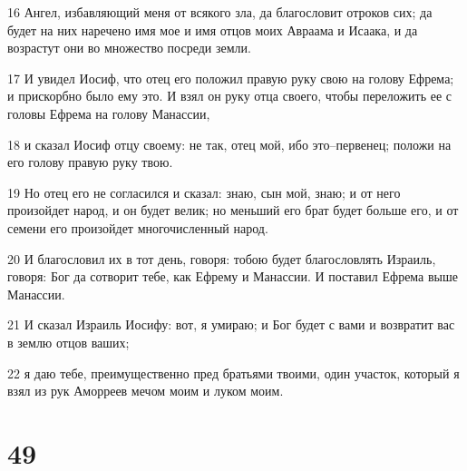 \par 16 Ангел, избавляющий меня от всякого зла, да благословит отроков сих; да будет на них наречено имя мое и имя отцов моих Авраама и Исаака, и да возрастут они во множество посреди земли.
\par 17 И увидел Иосиф, что отец его положил правую руку свою на голову Ефрема; и прискорбно было ему это. И взял он руку отца своего, чтобы переложить ее с головы Ефрема на голову Манассии,
\par 18 и сказал Иосиф отцу своему: не так, отец мой, ибо это--первенец; положи на его голову правую руку твою.
\par 19 Но отец его не согласился и сказал: знаю, сын мой, знаю; и от него произойдет народ, и он будет велик; но меньший его брат будет больше его, и от семени его произойдет многочисленный народ.
\par 20 И благословил их в тот день, говоря: тобою будет благословлять Израиль, говоря: Бог да сотворит тебе, как Ефрему и Манассии. И поставил Ефрема выше Манассии.
\par 21 И сказал Израиль Иосифу: вот, я умираю; и Бог будет с вами и возвратит вас в землю отцов ваших;
\par 22 я даю тебе, преимущественно пред братьями твоими, один участок, который я взял из рук Аморреев мечом моим и луком моим.

\chapter{49}

